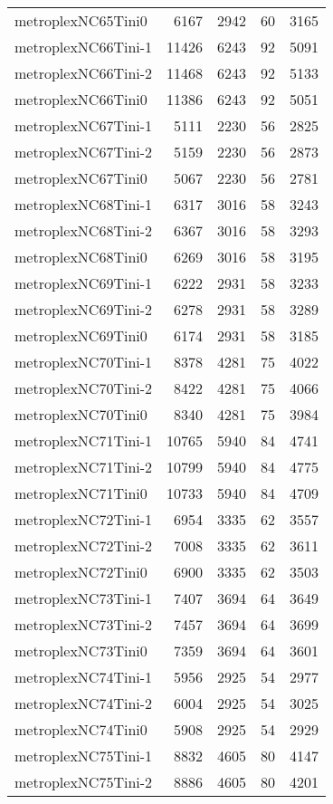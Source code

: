\begin{longtable}{lrrrr}
metroplexNC65Tini0 & 6167 & 2942 & 60 & 3165 \\
metroplexNC66Tini-1 & 11426 & 6243 & 92 & 5091 \\
metroplexNC66Tini-2 & 11468 & 6243 & 92 & 5133 \\
metroplexNC66Tini0 & 11386 & 6243 & 92 & 5051 \\
metroplexNC67Tini-1 & 5111 & 2230 & 56 & 2825 \\
metroplexNC67Tini-2 & 5159 & 2230 & 56 & 2873 \\
metroplexNC67Tini0 & 5067 & 2230 & 56 & 2781 \\
metroplexNC68Tini-1 & 6317 & 3016 & 58 & 3243 \\
metroplexNC68Tini-2 & 6367 & 3016 & 58 & 3293 \\
metroplexNC68Tini0 & 6269 & 3016 & 58 & 3195 \\
metroplexNC69Tini-1 & 6222 & 2931 & 58 & 3233 \\
metroplexNC69Tini-2 & 6278 & 2931 & 58 & 3289 \\
metroplexNC69Tini0 & 6174 & 2931 & 58 & 3185 \\
metroplexNC70Tini-1 & 8378 & 4281 & 75 & 4022 \\
metroplexNC70Tini-2 & 8422 & 4281 & 75 & 4066 \\
metroplexNC70Tini0 & 8340 & 4281 & 75 & 3984 \\
metroplexNC71Tini-1 & 10765 & 5940 & 84 & 4741 \\
metroplexNC71Tini-2 & 10799 & 5940 & 84 & 4775 \\
metroplexNC71Tini0 & 10733 & 5940 & 84 & 4709 \\
metroplexNC72Tini-1 & 6954 & 3335 & 62 & 3557 \\
metroplexNC72Tini-2 & 7008 & 3335 & 62 & 3611 \\
metroplexNC72Tini0 & 6900 & 3335 & 62 & 3503 \\
metroplexNC73Tini-1 & 7407 & 3694 & 64 & 3649 \\
metroplexNC73Tini-2 & 7457 & 3694 & 64 & 3699 \\
metroplexNC73Tini0 & 7359 & 3694 & 64 & 3601 \\
metroplexNC74Tini-1 & 5956 & 2925 & 54 & 2977 \\
metroplexNC74Tini-2 & 6004 & 2925 & 54 & 3025 \\
metroplexNC74Tini0 & 5908 & 2925 & 54 & 2929 \\
metroplexNC75Tini-1 & 8832 & 4605 & 80 & 4147 \\
metroplexNC75Tini-2 & 8886 & 4605 & 80 & 4201 \\

\end{longtable}
